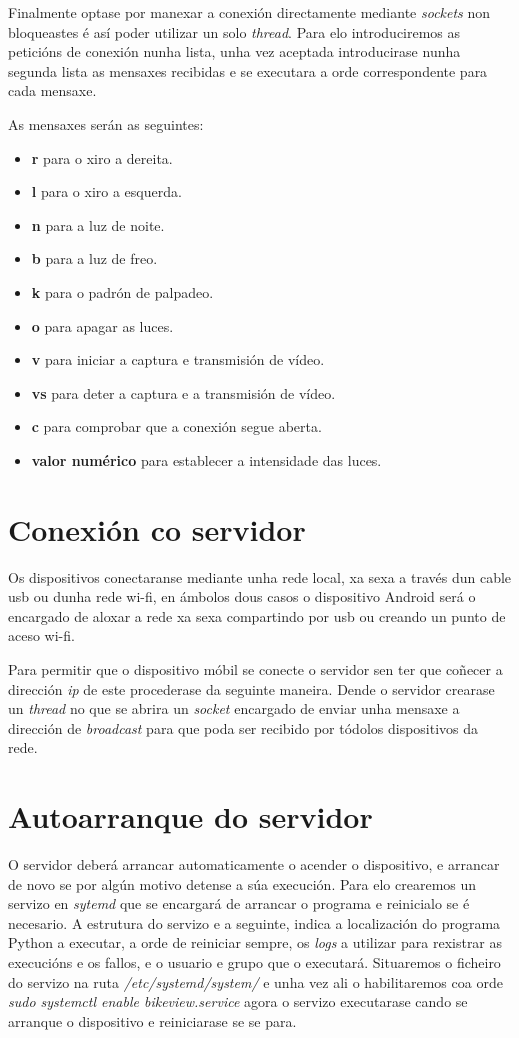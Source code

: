  Finalmente optase por manexar a conexión directamente mediante \emph{sockets} non bloqueastes é así poder utilizar un solo \emph{thread}. Para elo introduciremos as peticións de conexión nunha lista, unha vez aceptada introducirase nunha segunda lista as mensaxes recibidas e se executara a orde correspondente para cada mensaxe.

As mensaxes serán as seguintes:
\begin{itemize}
    \item \textbf{r} para o xiro a dereita.
    \item \textbf{l} para o xiro a esquerda.
    \item \textbf{n} para a luz de noite.
    \item \textbf{b} para a luz de freo.
    \item \textbf{k} para o padrón de palpadeo.
    \item \textbf{o} para apagar as luces.
    \item \textbf{v} para iniciar a captura e transmisión de vídeo.
    \item \textbf{vs} para deter a captura e a transmisión de vídeo.
    \item \textbf{c} para comprobar que a conexión segue aberta.
    \item \textbf{valor numérico} para establecer a intensidade das luces.
\end{itemize}

\section{Conexión co servidor}
Os dispositivos conectaranse mediante unha rede local, xa sexa a través dun cable usb ou dunha rede wi-fi, en ámbolos dous casos o dispositivo Android será o encargado de aloxar a rede xa sexa compartindo por usb ou creando un punto de aceso wi-fi.

Para permitir que o dispositivo móbil se conecte o servidor sen ter que coñecer a dirección \emph{ip} de este procederase da seguinte maneira. Dende o servidor crearase un \emph{thread} no que se abrira un \emph{socket} encargado de enviar unha mensaxe a dirección de \emph{broadcast} para que poda ser recibido por tódolos dispositivos da rede.

\section{Autoarranque do servidor}
O servidor deberá arrancar automaticamente o acender o dispositivo, e arrancar de novo se por algún motivo detense a súa execución. Para elo crearemos un servizo en \emph{sytemd} que se encargará de arrancar o programa e reinicialo se é necesario. A estrutura do servizo e a seguinte, indica a localización do programa Python a executar, a orde de reiniciar sempre, os \emph{logs} a utilizar para rexistrar as execucións e os fallos, e o usuario e grupo que o executará. Situaremos o ficheiro do servizo na ruta \textit{/etc/systemd/system/} e unha vez ali o habilitaremos coa orde \textit{sudo systemctl enable bikeview.service} agora o servizo executarase cando se arranque o dispositivo e reiniciarase se se para.

